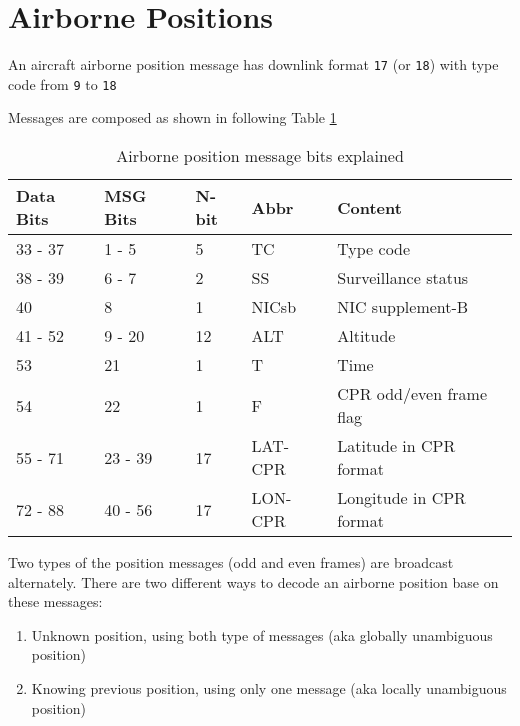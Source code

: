 \section{Airborne Positions}\label{airborne-positions}

An aircraft airborne position message has downlink format \texttt{17} (or \texttt{18}) with type code from \texttt{9} to \texttt{18}

Messages are composed as shown in following Table \ref{tb:adsb-pos-bits}

\begin{table}[!ht]
\centering
\caption{Airborne position message bits explained}
\label{tb:adsb-pos-bits}
\begin{tabular}{@{}lllll@{}}
\toprule
Data Bits & MSG Bits & N-bit & Abbr    & Content                 \\ \midrule
33 - 37   & 1 - 5    & 5     & TC      & Type code               \\
38 - 39   & 6 - 7    & 2     & SS      & Surveillance status     \\
40        & 8        & 1     & NICsb   & NIC supplement-B        \\
41 - 52   & 9 - 20   & 12    & ALT     & Altitude                \\
53        & 21       & 1     & T       & Time                    \\
54        & 22       & 1     & F       & CPR odd/even frame flag \\
55 - 71   & 23 - 39  & 17    & LAT-CPR & Latitude in CPR format  \\
72 - 88   & 40 - 56  & 17    & LON-CPR & Longitude in CPR format \\ \bottomrule
\end{tabular}
\end{table}

Two types of the position messages (odd and even frames) are broadcast alternately. There are two different ways to decode an airborne position base on these messages:

\begin{enumerate}
\def\labelenumi{\arabic{enumi}.}

\item
  Unknown position, using both type of messages (aka globally unambiguous position)
\item
  Knowing previous position, using only one message (aka locally unambiguous position)
\end{enumerate}

